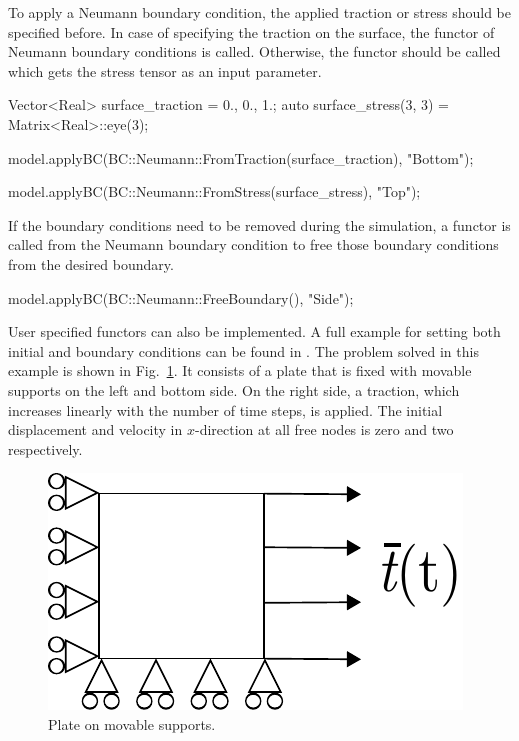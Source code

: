 To apply a Neumann boundary condition, the applied traction or stress
should be specified before. In case of specifying the traction on the
surface, the functor  of Neumann boundary
conditions is called. Otherwise, the functor  should
be called which gets the stress tensor as an input parameter.

\begin{cpp}
Vector<Real> surface_traction = {0., 0., 1.};
auto surface_stress(3, 3) = Matrix<Real>::eye(3);

model.applyBC(BC::Neumann::FromTraction(surface_traction), "Bottom");

model.applyBC(BC::Neumann::FromStress(surface_stress), "Top");
\end{cpp}

If the boundary conditions need to be removed during the simulation, a
functor is called from the Neumann boundary condition to free those
boundary conditions from the desired boundary.

\begin{cpp}
 model.applyBC(BC::Neumann::FreeBoundary(), "Side");
\end{cpp}

User specified functors can also be implemented.  A full example for
setting both initial and boundary conditions can be found in
.  The problem solved
in this example is shown in Fig.~\ref{fig:smm:bc_and_ic}. It consists
of a plate that is fixed with movable supports on the left and bottom
side. On the right side, a traction, which increases linearly with the
number of time steps, is applied. The initial displacement and
velocity in $x$-direction at all free nodes is zero and two
respectively.
\begin{figure}[!htb]
  \centering
  \includegraphics[scale=0.8]{figures/bc_and_ic_example}
  \caption{Plate on movable supports.\label{fig:smm:bc_and_ic}}
\end{figure}

